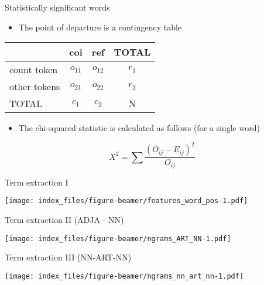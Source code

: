 \documentclass[
  ignorenonframetext,
]{beamer}
\providecommand{\tightlist}{%
  \setlength{\itemsep}{0pt}\setlength{\parskip}{0pt}}
\begin{document}
\begin{frame}{Statistically significant words}
\protect\hypertarget{statistically-significant-words}{}

\begin{itemize}
\tightlist
\item
  The point of departure is a contingency table
\end{itemize}

\begin{longtable}[]{@{}lccc@{}}
\toprule
& coi & ref & TOTAL\tabularnewline
\midrule
\endhead
count token & \(o_{11}\) & \(o_{12}\) & \(r_{1}\)\tabularnewline
other tokens & \(o_{21}\) & \(o_{22}\) & \(r_{2}\)\tabularnewline
TOTAL & \(c_{1}\) & \(c_{2}\) & N\tabularnewline
\bottomrule
\end{longtable}

\begin{itemize}
\tightlist
\item
  The chi-squared statistic is calculated as follows (for a single word)
\end{itemize}

\[ X^{2} = \sum{\frac{(O_{ij} - E_{ij})^2}{O_{ij}}}\]

\end{frame}

\begin{frame}{Term extraction I}
\protect\hypertarget{term-extraction-i}{}

\texttt{[image: index\_files/figure-beamer/features\_word\_pos-1.pdf]}

\end{frame}

\begin{frame}{Term extraction II (ADJA - NN)}
\protect\hypertarget{term-extraction-ii-adja---nn}{}

\texttt{[image: index\_files/figure-beamer/ngrams\_ART\_NN-1.pdf]}

\end{frame}

\begin{frame}{Term extraction III (NN-ART-NN)}
\protect\hypertarget{term-extraction-iii-nn-art-nn}{}

\texttt{[image: index\_files/figure-beamer/ngrams\_nn\_art\_nn-1.pdf]}

\end{frame}
\end{document}
